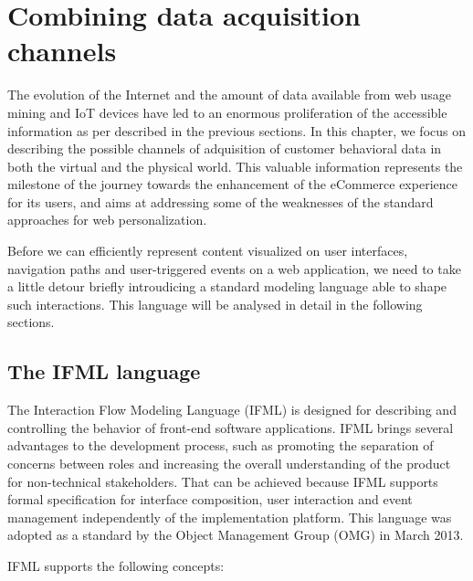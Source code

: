 \chead{}
\chapter{Combining data acquisition channels}

The evolution of the Internet and the amount of data available from web usage mining and IoT devices have led to an enormous proliferation of the accessible information as per described in the previous sections.  In this chapter, we focus on describing the possible channels of adquisition of customer behavioral data in both the virtual and the physical world. This valuable information represents the milestone of the journey towards the enhancement of the eCommerce experience for its users, and aims at addressing some of the weaknesses of the standard approaches for web personalization.

Before we can efficiently represent content visualized on user interfaces, navigation paths and user-triggered events on a web application, we need to take a little detour briefly introudicing a standard modeling language able to shape such interactions. This language will be analysed in detail in the following sections.

\section{The IFML language}
\label{the-ifml-language}

The Interaction Flow Modeling Language (IFML)\cite{IFML-1, IFML-2} is designed for describing and controlling the behavior of front-end software applications. IFML brings several advantages to the development process, such as promoting the separation of concerns between roles and increasing the overall understanding of the product for non-technical stakeholders. That can be achieved because IFML supports formal specification for interface composition, user interaction and event management independently of the implementation platform. This language was adopted as a standard by the Object Management Group (OMG) in March 2013.

IFML supports the following concepts: 

